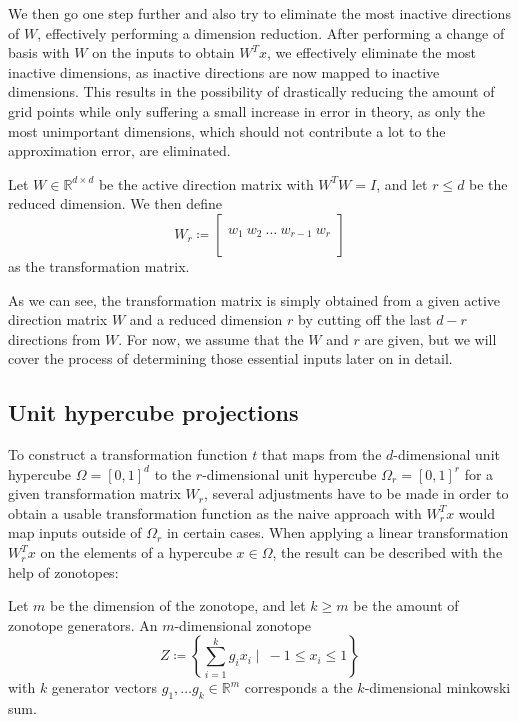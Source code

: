 \documentclass[
  a4paper,  %
  twoside,  %
  bibliography=totoc,
  headsepline,
  cleardoublepage=empty,
  parskip=half,
  draft=false
]{scrbook}
\begin{document}
We then go one step further and also try to eliminate the most inactive directions of $W$, effectively performing a dimension reduction.
After performing a change of basis with $W$ on the inputs to obtain $W^T x$, we effectively eliminate the most inactive dimensions, as inactive directions are now mapped to inactive dimensions.
This results in the possibility of drastically reducing the amount of grid points while only suffering a small increase in error in theory, as only the most unimportant dimensions, which should not contribute a lot to the approximation error, are eliminated.

\begin{definition}
Let $W \in \mathds{R}^{d \times d}$ be the active direction matrix with $W^T W=I$, and let $r \leq d$ be the reduced dimension.
We then define
\begin{equation}
W_r \coloneqq \begin{bmatrix}
  \\
    w_1 ~ w_2 ~ \dots ~ w_{r-1} ~ w_r\\
    \\
  \end{bmatrix}
\end{equation}
as the transformation matrix.
\end{definition}

As we can see, the transformation matrix is simply obtained from a given active direction matrix $W$ and a reduced dimension $r$ by cutting off the last $d - r$ directions from $W$.
For now, we assume that the $W$ and $r$ are given, but we will cover the process of determining those essential inputs later on in detail.

\subsection{Unit hypercube projections}

To construct a transformation function $t$ that maps from the $d$-dimensional unit hypercube $\Omega=[0,1]^d$ to the $r$-dimensional unit hypercube $\Omega_r=[0,1]^r$ for a given transformation matrix $W_r$, several adjustments have to be made in order to obtain a usable transformation function as the naive approach with $W_r^T x$ would map inputs outside of $\Omega_r$ in certain cases.
When applying a linear transformation $W_r^T x$ on the elements of a hypercube $x \in \Omega$, the result can be described with the help of zonotopes:

\begin{definition}[Zonotope]
Let $m$ be the dimension of the zonotope, and let $k \geq  m$ be the amount of zonotope generators.
An $m$-dimensional zonotope
\begin{equation}
Z \coloneqq \left\{\sum_{i=1}^k g_i x_i \mid ~ -1 \leq x_i \leq 1\right\}
  \label{zonotope}
\end{equation}
with $k$ generator vectors $g_1, \dots g_k \in \mathds{R}^m$ corresponds a the $k$-dimensional minkowski sum.
\end{definition}
\end{document}
